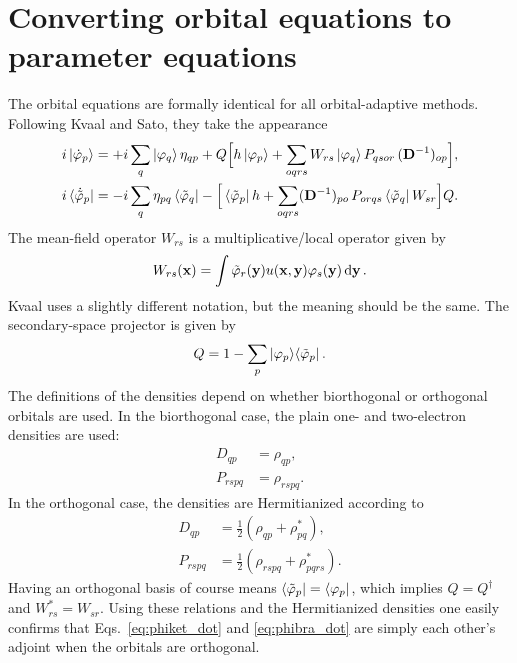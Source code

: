 \documentclass[aip,jcp,preprint,superscriptaddress,nofootinbib]{revtex4-1}
\begin{document}
\section{Converting orbital equations to parameter equations}
The orbital equations are formally identical for all orbital-adaptive methods.
Following Kvaal\cite{kvaalInitioQuantumDynamics2012} and Sato\cite{satoCommunicationTimedependentOptimized2018}, 
they take the appearance
\begin{subequations}
    \begin{align}
        i \ket{\dot{\varphi}_{p}} 
        &= +i \sum_{q} \ket{\varphi_{q}} \eta_{qp}
        + Q \Big[
        h \ket{\varphi_{p}} + \sum_{oqrs} W_{rs} \ket{\varphi_{q}} P_{qsor} \, (\mathbf{D}^{-1})_{op}
        \Big], \label{eq:phiket_dot} \\
        i \bra{\dot{\tilde{\varphi}}_{p}} 
        &= -i \sum_{q} \eta_{pq} \bra{\tilde{\varphi}_{q}} -
        \Big[
        \bra{\tilde{\varphi}_{p}} h + \sum_{oqrs} (\mathbf{D}^{-1})_{po} \, P_{orqs}  \bra{\tilde{\varphi}_{q}} W_{sr} 
        \Big] Q. \label{eq:phibra_dot}
    \end{align}
\end{subequations}
The mean-field operator\cite{miyagiTimedependentRestrictedactivespaceSelfconsistentfield2013,satoTimedependentCompleteactivespaceSelfconsistentfield2013}
$W_{rs}$ is a multiplicative/local operator given by
\begin{align}
    W_{rs} (\mathbf{x}) = \int \tilde{\varphi}_{r} (\mathbf{y}) u(\mathbf{x}, \mathbf{y}) \varphi_{s} (\mathbf{y}) \dd{\mathbf{y}}.
\end{align}
Kvaal\cite{kvaalInitioQuantumDynamics2012} uses a slightly different notation, but the meaning should be the same. 
The secondary-space projector is given by
\begin{align}
    Q = 1 - \sum_{p} \ket{\varphi_{p}} \! \bra{\tilde{\varphi}_{p}}.
\end{align}
The definitions of the densities depend on whether biorthogonal\cite{kvaalInitioQuantumDynamics2012}
or orthogonal\cite{satoTimedependentCompleteactivespaceSelfconsistentfield2013} orbitals are used.
In the biorthogonal case, the plain one- and two-electron densities are used:
\begin{align}
    D_{qp}   &= \rho_{qp}, \\
    P_{rspq} &= \rho_{rspq}.
\end{align}
In the orthogonal case, the densities are Hermitianized according to
\begin{align}
    D_{qp}   &= \tfrac{1}{2} ( \rho_{qp}   + \rho_{pq}^*   ), \\
    P_{rspq} &= \tfrac{1}{2} ( \rho_{rspq} + \rho_{pqrs}^* ).
\end{align}
Having an orthogonal basis of course means $\bra{\tilde{\varphi}_{p}} = \bra{\varphi_{p}}$,
which implies $Q = Q^{\dagger}$ and $W_{rs}^* = W_{sr}$. Using these relations
and the Hermitianized densities one easily confirms that Eqs.~\eqref{eq:phiket_dot}
and \eqref{eq:phibra_dot} are simply each other's adjoint
when the orbitals are orthogonal.
\end{document}
